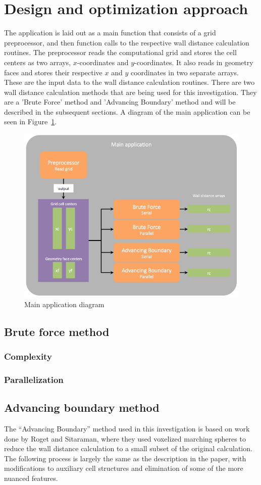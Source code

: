 \documentclass[]{aiaa-tc}%
\begin{document}
\section{Design and optimization approach}
The application is laid out as a main function that consists of a
grid preprocessor, and then function calls to the respective wall
distance calculation routines. The preprocessor reads the
computational grid and stores the cell centers as two arrays,
$x$-coordinates and $y$-coordinates. It also reads in geometry faces and
stores their respective $x$ and $y$ coordinates in two separate
arrays. These are the input data to the wall distance calculation
routines. There are two wall distance calculation methods that are
being used for this investigation. They are a 'Brute Force' method and
'Advancing Boundary' method and will be described in the subsequent
sections. A diagram of the main application can be seen in Figure~\ref{f:main_application}.

\begin{figure}
  \centering
  \includegraphics[width=0.6\linewidth]{figures/main_application_2}
  \caption{Main application diagram}
  \label{f:main_application}
\end{figure}


\subsection{Brute force method}

\subsubsection{Complexity}

\subsubsection{Parallelization}


\subsection{Advancing boundary method}
The ``Advancing Boundary'' method used in this investigation is based
on work done by Roget and Sitaraman, where they used
voxelized marching spheres to reduce the wall distance calculation to a small
subset of the original calculation.\cite{roget:12} The following process is largely the
same as the description in the paper, with modifications to auxiliary
cell structures and elimination of some of the more nuanced features.
\end{document}
